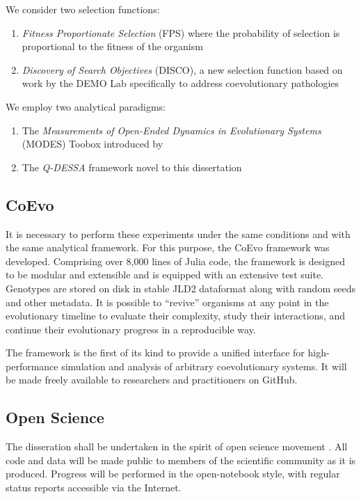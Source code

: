 \documentclass{article}
\begin{document}
We consider two selection functions:
\begin{enumerate}
    \item \textit{Fitness Proportionate Selection} (FPS) where the probability of selection 
        is proportional to the fitness of the organism
    \item \textit{Discovery of Search Objectives} (DISCO), a new selection function based on 
        work by the DEMO Lab specifically to address coevolutionary pathologies \citep{liskowski2016online}
\end{enumerate}

We employ two analytical paradigms:
\begin{enumerate}
    \item The \textit{Measurements of Open-Ended Dynamics in Evolutionary Systems} (MODES) Toobox
        introduced by \citet{dolson2019modes}
    \item The \textit{Q-DESSA} framework novel to this dissertation
\end{enumerate}

\subsection*{CoEvo}
It is necessary to perform these experiments under the same conditions and with the same analytical framework.
For this purpose, the CoEvo framework was developed. Comprising over 8,000 lines of Julia code,
the framework is designed to be modular and extensible and is equipped with an extensive test
suite. Genotypes are stored on disk in stable JLD2 dataformat along with random seeds and other metadata.
It is possible to ``revive'' organisms at any point in the evolutionary timeline to evaluate 
their complexity, study their interactions, and continue their evolutionary progress in a 
reproducible way. 

The framework is the first of its kind to provide a unified interface for high-performance 
simulation and analysis of arbitrary coevolutionary systems. It will be made freely available to researchers and practitioners
on GitHub.

\subsection*{Open Science}
The disseration shall be undertaken in the spirit of open science movement 
\citep{vicente2018open}. All code and data
will be made public to members of the scientific community as it is produced. Progress will be 
performed in the open-notebook style, with regular status reports accessible via the Internet.
\end{document}
